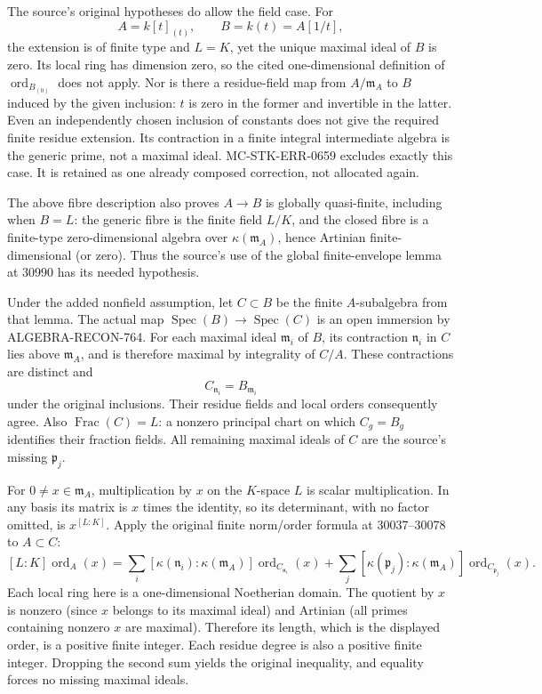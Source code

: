 The source's original hypotheses do allow the field case. For \[
 A=k[t]_{(t)},\qquad B=k(t)=A[1/t],
\] the extension is of finite type and \(L=K\), yet the unique maximal ideal of \(B\) is zero. Its local ring has dimension zero, so the cited one-dimensional definition of \(\operatorname{ord}_{B_{(0)}}\) does not apply. Nor is there a residue-field map from \(A/\mathfrak m_A\) to \(B\) induced by the given inclusion: \(t\) is zero in the former and invertible in the latter. Even an independently chosen inclusion of constants does not give the required finite residue extension. Its contraction in a finite integral intermediate algebra is the generic prime, not a maximal ideal. MC-STK-ERR-0659 excludes exactly this case. It is retained as one already composed correction, not allocated again.

The above fibre description also proves \(A\to B\) is globally quasi-finite, including when \(B=L\): the generic fibre is the finite field \(L/K\), and the closed fibre is a finite-type zero-dimensional algebra over \(\kappa(\mathfrak m_A)\), hence Artinian finite-dimensional (or zero). Thus the source's use of the global finite-envelope lemma at 30990 has its needed hypothesis.

Under the added nonfield assumption, let \(C\subset B\) be the finite \(A\)-subalgebra from that lemma. The actual map \(\operatorname{Spec}(B)\to\operatorname{Spec}(C)\) is an open immersion by ALGEBRA-RECON-764. For each maximal ideal \(\mathfrak m_i\) of \(B\), its contraction \(\mathfrak n_i\) in \(C\) lies above \(\mathfrak m_A\), and is therefore maximal by integrality of \(C/A\). These contractions are distinct and \[
 C_{\mathfrak n_i}=B_{\mathfrak m_i}
\] under the original inclusions. Their residue fields and local orders consequently agree. Also \(\operatorname{Frac}(C)=L\): a nonzero principal chart on which \(C_g=B_g\) identifies their fraction fields. All remaining maximal ideals of \(C\) are the source's missing \(\mathfrak p_j\).

For \(0\ne x\in\mathfrak m_A\), multiplication by \(x\) on the \(K\)-space \(L\) is scalar multiplication. In any basis its matrix is \(x\) times the identity, so its determinant, with no factor omitted, is \(x^{[L:K]}\). Apply the original finite norm/order formula at 30037--30078 to \(A\subset C\): \[
 [L:K]\operatorname{ord}_A(x)
 =
 \sum_i[\kappa(\mathfrak n_i):\kappa(\mathfrak m_A)]
          \operatorname{ord}_{C_{\mathfrak n_i}}(x)
 +
 \sum_j[\kappa(\mathfrak p_j):\kappa(\mathfrak m_A)]
          \operatorname{ord}_{C_{\mathfrak p_j}}(x).
 \tag{1}
\] Each local ring here is a one-dimensional Noetherian domain. The quotient by \(x\) is nonzero (since \(x\) belongs to its maximal ideal) and Artinian (all primes containing nonzero \(x\) are maximal). Therefore its length, which is the displayed order, is a positive finite integer. Each residue degree is also a positive finite integer. Dropping the second sum yields the original inequality, and equality forces no missing maximal ideals.

